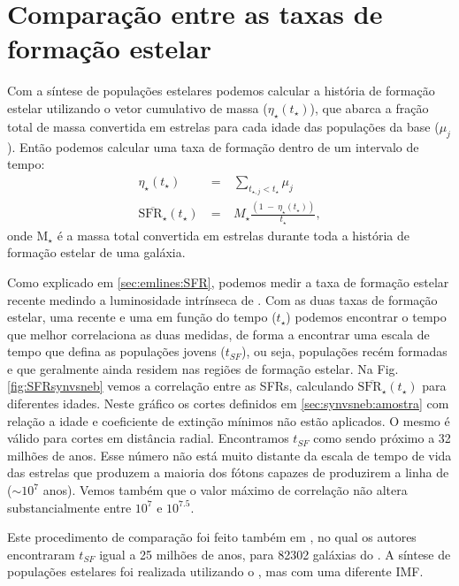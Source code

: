 
\section{Comparação entre as taxas de formação estelar}
\label{sec:synvsneb:SFR}

Com a síntese de populações estelares podemos calcular a história de formação estelar utilizando o
vetor cumulativo de massa ($\eta_\star(t_\star)$), que abarca a fração total de massa convertida em
estrelas para cada idade das populações da base ($\mu_j$). Então podemos calcular uma taxa de
formação dentro de um intervalo de tempo:
\begin{eqnarray}
	\eta_\star(t_\star)\ &=&\ \sum\limits_{t_{\star,j} < t_\star} \mu_j \\
	\overline{\mathrm{SFR}_\star}(t_\star)\ &=&\ M_\star \frac{(1\ -\ \eta_\star(t_\star))}{t_\star},
\end{eqnarray}
\noindent onde M${}_\star$ é a massa total convertida em estrelas durante toda a história de
formação estelar de uma galáxia. 

Como explicado em \ref{sec:emlines:SFR}, podemos medir a taxa de formação estelar recente medindo a
luminosidade intrínseca de \Halpha. Com as duas taxas de formação estelar, uma recente e uma em
função do tempo ($t_\star$) podemos encontrar o tempo que melhor correlaciona as duas medidas, de
forma a encontrar uma escala de tempo que defina as populações jovens ($t_{SF}$), ou seja,
populações recém formadas e que geralmente ainda residem nas regiões de formação estelar. Na Fig.
\ref{fig:SFRsynvsneb} vemos a correlação entre as SFRs, calculando
$\overline{\mathrm{SFR}_\star}(t_\star)$ para diferentes idades. Neste gráfico os cortes
definidos em \ref{sec:synvsneb:amostra} com relação a idade e coeficiente de extinção mínimos não
estão aplicados. O mesmo é válido para cortes em distância radial. Encontramos $t_{SF}$ como sendo
próximo a 32 milhões de anos. Esse número não está muito distante da escala de tempo de vida das
estrelas que produzem a maioria dos fótons capazes de produzirem a linha de \Halpha ($\sim10^7$
anos). Vemos também que o valor máximo de correlação não altera substancialmente entre $10^7$ e
$10^{7.5}$.

Este procedimento de comparação foi feito também em \citet{Asari.etal.2007a}, no qual os autores
encontraram $t_{SF}$ igual a 25 milhões de anos, para 82302 galáxias do \SDSS. A síntese de
populações estelares foi realizada utilizando o \starlight, mas com uma diferente IMF.

